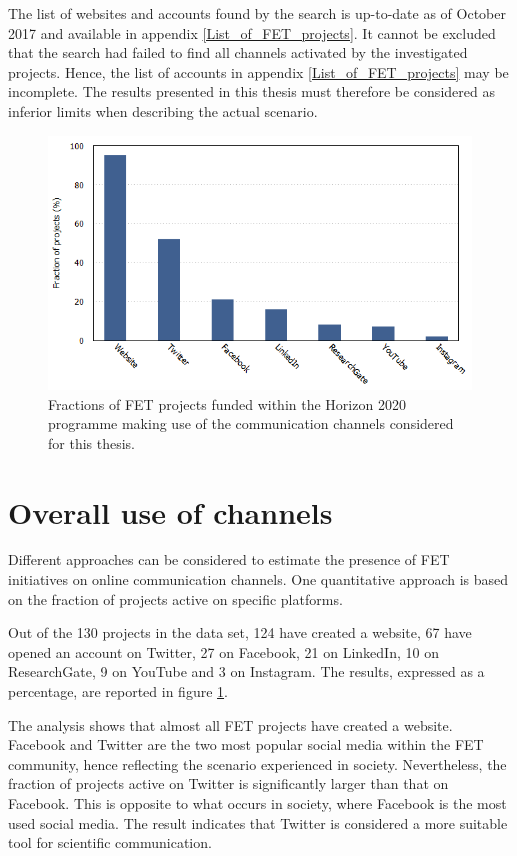The list of websites and accounts found by the search is up-to-date as of October 2017 and available in appendix \ref{List_of_FET_projects}. It cannot be excluded that the search had failed to find all channels activated by the investigated projects. Hence, the list of accounts in appendix \ref{List_of_FET_projects} may be incomplete. The results presented in this thesis must therefore be considered as inferior limits when describing the actual scenario. 

\begin{figure}[!t] 
 \begin{center}
 \includegraphics[scale=0.47]{Images/Social_media.png}
 \caption{Fractions of FET projects funded within the Horizon 2020 programme making use of the communication channels considered for this thesis.}
 \label{Social_media}
 \end{center}
\end{figure}

\section{Overall use of channels} \label{Overall_use_of_channels}
Different approaches can be considered to estimate the presence of FET initiatives on online communication channels. One quantitative approach is based on the fraction of projects active on specific platforms.

Out of the 130 projects in the data set, 124 have created a website, 67 have opened an account on Twitter, 27 on Facebook, 21 on LinkedIn, 10 on ResearchGate, 9 on YouTube and 3 on Instagram. The results, expressed as a percentage, are reported in figure \ref{Social_media}.

The analysis shows that almost all FET projects have created a website. Facebook and Twitter are the two most popular social media within the FET community, hence reflecting the scenario experienced in society. Nevertheless, the fraction of projects active on Twitter is significantly larger than that on Facebook. This is opposite to what occurs in society, where Facebook is the most used social media. The result indicates that Twitter is considered a more suitable tool for scientific communication. 


